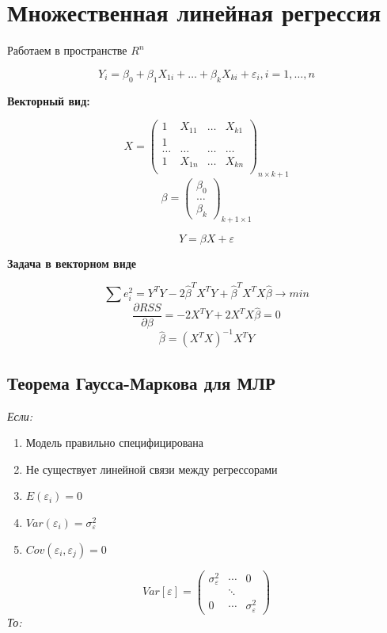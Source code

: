 \documentclass[a4paper, 12pt]{article}
\begin{document}
\section{Множественная линейная регрессия}

Работаем в пространстве $R^n$

\[Y_i = \beta_0 + \beta_1 X_{1i} + \ldots + \beta_kX_{ki} + \varepsilon_i, i = 1, \ldots, n\]

\textbf{Векторный вид:}

\[X = \begin{pmatrix}
    1 & X_{11} & \ldots & X_{k1} \\
    1 & & & \\
    \ldots & \ldots & \ldots & \ldots \\
    1 & X_{1n} & \ldots & X_{kn} \\
\end{pmatrix}_{n \times k + 1}\]
\[\beta = \begin{pmatrix}
    \beta_0 \\
    \ldots \\
    \beta_{k}
\end{pmatrix}_{k + 1 \times 1}\]

\[Y = \beta X + \varepsilon\]

\textbf{Задача в векторном виде}

\[\sum e_i^2 = Y^T Y - 2\hat{\beta}^{T}X^{T}Y + \hat{\beta}^T X^T X \hat{\beta} \rightarrow min\]
\[\frac{\partial RSS}{\partial \beta} = -2X^{T}Y + 2X^{T}X\hat{\beta} = 0\]
\[\hat{\beta} = (X^TX)^{-1}X^TY\]

\subsection{Теорема Гаусса-Маркова для МЛР}

\textit{Если:}

\begin{enumerate}
    \item Модель правильно специфицирована
    \item Не существует линейной связи между регрессорами
    \item $E(\varepsilon_i) = 0$
    \item $Var(\varepsilon_i) = \sigma^2_\varepsilon$
    \item $Cov(\varepsilon_i, \varepsilon_j) = 0$
\end{enumerate}

\[Var[\varepsilon] = 
\begin{pmatrix}
    \sigma_{\varepsilon}^2 & \cdots & 0 \\
    & \ddots & \\
    0 & \cdots & \sigma^{2}_{\varepsilon}
\end{pmatrix}
\]
\textit{То:}
\end{document}
